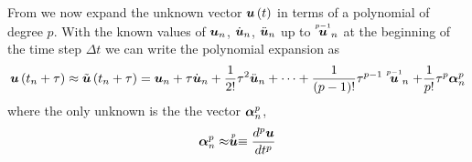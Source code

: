 From \cite{zienkiewicz:2006_1} we now expand the unknown vector $ \boldsymbol{u}\left( t \right) $ in terms of a polynomial of degree
$p$. With the known values of $\boldsymbol{u}_{n}$, $\dot{\boldsymbol{u}}_{n}$,
$\ddot{\boldsymbol{u}}_{n}$ up to $ \stackrel{\scriptscriptstyle p-1}{\boldsymbol{u}} _{n}$ at the beginning of
the time step $\Delta t$ we can write the polynomial expansion as
\begin{equation}
  \fnof{\vectr{u}}{t_{n}+\tau}\approx\fnof{\tilde{\vectr{u}}}{t_{n}+\tau}=\vectr{u}_{n}+\tau\dot{\vectr{u}}_{n}+
  \frac{1}{2!}\tau^{2}\ddot{\vectr{u}}_{n}+\cdots+\dfrac{1}{\factorial{p-1}}\tau^{p-1}\symover{p-1}{\vectr{u}}_{n}+
  \dfrac{1}{p!}\tau^{p}\vectr{\alpha}^{p}_{n}
  \label{eqn:timepolyexpansion}
\end{equation}
where the only unknown is the the vector $\boldsymbol{\alpha}^{p}_{n}$,
\begin{equation}
  \boldsymbol{\alpha}^{p}_{n}\approx \stackrel{\scriptscriptstyle p}{\boldsymbol{u}} \equiv \dfrac{ d^{p} \boldsymbol{u}}{d {t}^{p}} 
\end{equation}

